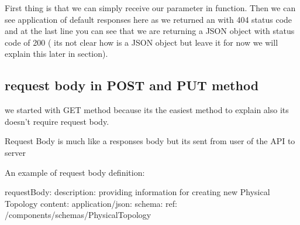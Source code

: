 \documentclass[letterpaper,10pt,english]{sphinxmanual}
\begin{document}
\begin{sphinxVerbatim}[commandchars=\\\{\}]
 
     
    
         
            
        
\end{sphinxVerbatim}

First thing is that we can simply receive our parameter in function.
Then we can see application of default responses here as we returned an  with 404 status code
and at the last line you can see that we are returning a JSON object with status code of 200 ( its not clear how 
is a JSON object but leave it for now we will explain this later in  section).


\subsection{request body in POST and PUT method}
\label{\detokenize{RestAPI:request-body-in-post-and-put-method}}
we started with GET method because its the easiest method to explain also its doesn’t require
request body.

Request Body is much like a responses body but its sent from user of the API to server

An example of request body definition:

\begin{sphinxVerbatim}[commandchars=\\\{\}]
requestBody:
  description: providing information for creating new Physical Topology
  content:
    application/json:
    schema:
      \PYGZdl{}ref: \PYGZsq{}\PYGZsh{}/components/schemas/PhysicalTopology\PYGZsq{}
\end{sphinxVerbatim}
\end{document}
